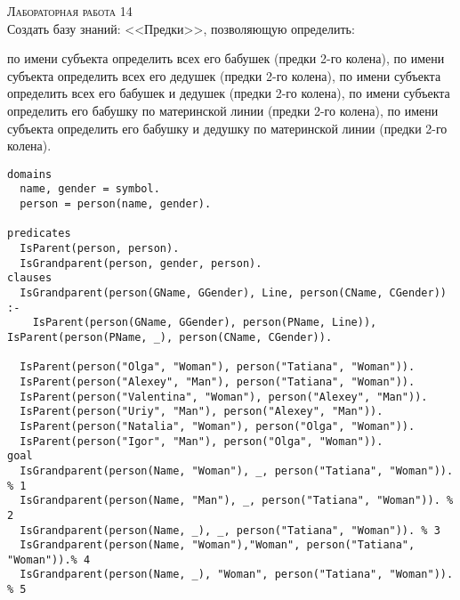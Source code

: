 \textsc{\huge Лабораторная работа 14} \\
Создать базу знаний: <<Предки>>, позволяющую определить:
\begin{tasks}[label=\arabic*]
	\task по имени субъекта определить всех его бабушек (предки 2-го колена),
	\task по имени субъекта определить всех его дедушек (предки 2-го колена),
	\task по имени субъекта определить всех его бабушек и дедушек (предки 2-го колена),
	\task по имени субъекта определить его бабушку по материнской линии (предки 2-го колена),
	\task по имени субъекта определить его бабушку и дедушку по материнской линии (предки 2-го колена).
\end{tasks}

\begin{lstlisting}
domains
  name, gender = symbol.
  person = person(name, gender).

predicates
  IsParent(person, person).
  IsGrandparent(person, gender, person).
clauses
  IsGrandparent(person(GName, GGender), Line, person(CName, CGender)) :- 
    IsParent(person(GName, GGender), person(PName, Line)), IsParent(person(PName, _), person(CName, CGender)).

  IsParent(person("Olga", "Woman"), person("Tatiana", "Woman")).
  IsParent(person("Alexey", "Man"), person("Tatiana", "Woman")).
  IsParent(person("Valentina", "Woman"), person("Alexey", "Man")).
  IsParent(person("Uriy", "Man"), person("Alexey", "Man")).
  IsParent(person("Natalia", "Woman"), person("Olga", "Woman")).
  IsParent(person("Igor", "Man"), person("Olga", "Woman")).
goal
  IsGrandparent(person(Name, "Woman"), _, person("Tatiana", "Woman")). % 1
  IsGrandparent(person(Name, "Man"), _, person("Tatiana", "Woman")). % 2
  IsGrandparent(person(Name, _), _, person("Tatiana", "Woman")). % 3
  IsGrandparent(person(Name, "Woman"),"Woman", person("Tatiana", "Woman")).% 4
  IsGrandparent(person(Name, _), "Woman", person("Tatiana", "Woman")). % 5
\end{lstlisting}

